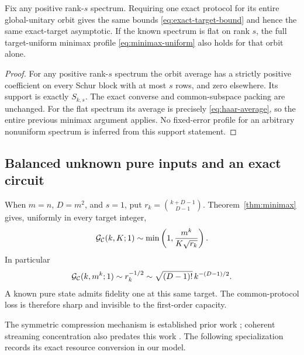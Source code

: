 \begin{corollary}\label{cor:known-spectrum}
Fix any positive rank-$s$ spectrum. Requiring one exact protocol for its entire global-unitary orbit gives the same bounds \eqref{eq:exact-target-bound} and hence the same exact-target asymptotic. If the known spectrum is flat on rank $s$, the full target-uniform minimax profile \eqref{eq:minimax-uniform} also holds for that orbit alone.
\end{corollary}
\begin{proof}
For any positive rank-$s$ spectrum the orbit average has a strictly positive coefficient on every Schur block with at most $s$ rows, and zero elsewhere. Its support is exactly $S_{k,s}$. The exact converse and common-subspace packing are unchanged. For the flat spectrum its average is precisely \eqref{eq:haar-average}, so the entire previous minimax argument applies. No fixed-error profile for an arbitrary nonuniform spectrum is inferred from this support statement.
\end{proof}

\subsection{Balanced unknown pure inputs and an exact circuit}
When $m=n$, $D=m^2$, and $s=1$, put $r_k=\binom{k+D-1}{D-1}$. Theorem~\ref{thm:minimax} gives, uniformly in every target integer,
\[
 \mathcal G_{\mathcal C}(k,K;1)\sim\min\left(1,\frac{m^k}{K\sqrt{r_k}}\right).
\]
In particular
\begin{equation}\label{eq:pure-full-output}
 \mathcal G_{\mathcal C}(k,m^k;1)\sim r_k^{-1/2}
 \sim\sqrt{(D-1)!}\,k^{-(D-1)/2}.
\end{equation}
A known pure state admits fidelity one at this same target. The common-protocol loss is therefore sharp and invisible to the first-order capacity.

The symmetric compression mechanism is established prior work \cite{plesch,baertschi,chen}; coherent streaming concentration also predates this work \cite{streaming}. The following specialization records its exact resource conversion in our model.


